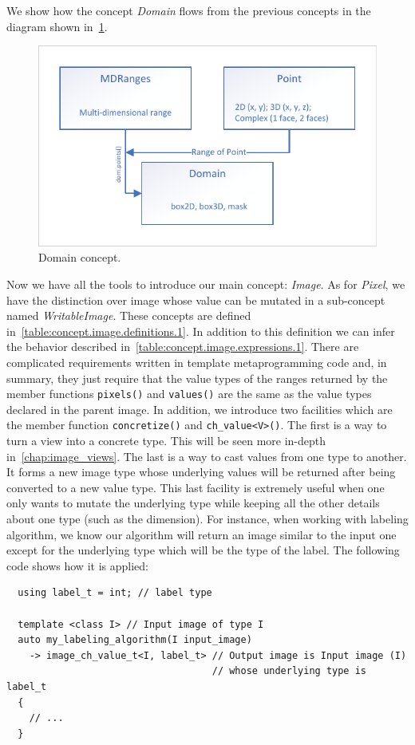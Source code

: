 We show how the concept \emph{Domain} flows from the previous concepts in the diagram shown in~\cref{fig:concept.domain}.

\begin{figure}[htbp]
  \centering
  \includegraphics[width=.8\linewidth]{../figures/concepts/domain}
  \caption{Domain concept.}
  \label{fig:concept.domain}
\end{figure}

Now we have all the tools to introduce our main concept: \emph{Image}. As for \emph{Pixel}, we have the distinction over
image whose value can be mutated in a sub-concept named \emph{WritableImage}. These concepts are defined
in~\cref{table:concept.image.definitions.1}. In addition to this definition we can infer the behavior described
in~\cref{table:concept.image.expressions.1}. There are complicated requirements written in template metaprogramming code
and, in summary, they just require that the value types of the ranges returned by the member functions \texttt{pixels()}
and \texttt{values()} are the same as the value types declared in the parent image. In addition, we introduce two
facilities which are the member function \texttt{concretize()} and \texttt{ch\_value<V>()}. The first is a way to turn a
view into a concrete type. This will be seen more in-depth in~\cref{chap:image_views}. The last is a way to cast values
from one type to another. It forms a new image type whose underlying values will be returned after being converted to a
new value type. This last facility is extremely useful when one only wants to mutate the underlying type while keeping
all the other details about one type (such as the dimension). For instance, when working with labeling algorithm, we
know our algorithm will return an image similar to the input one except for the underlying type which will be the type
of the label. The following code shows how it is applied:
\begin{verbatim}
  using label_t = int; // label type

  template <class I> // Input image of type I
  auto my_labeling_algorithm(I input_image)
    -> image_ch_value_t<I, label_t> // Output image is Input image (I)
                                    // whose underlying type is label_t
  {
    // ...
  }
\end{verbatim}

